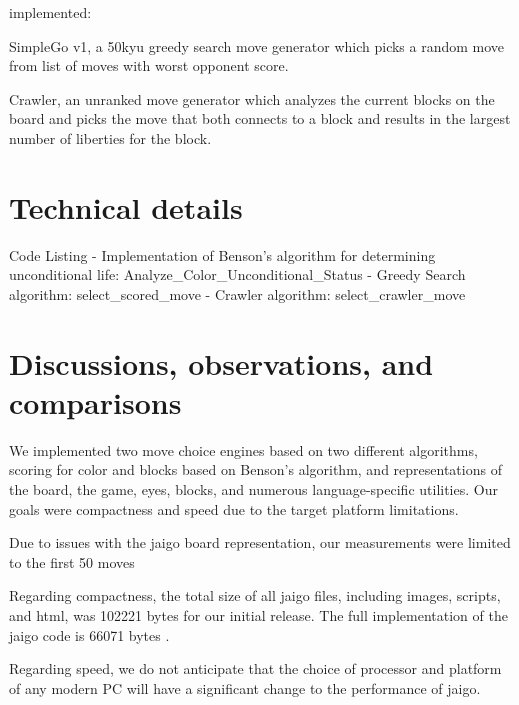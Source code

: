\documentclass{memoir}
\begin{document}
implemented:

SimpleGo v1, a 50kyu greedy search move generator which picks a random move from list of moves with worst opponent score.

Crawler, an unranked move generator which analyzes the current blocks on the board and picks the move that both connects to a block and results in the largest number of liberties for the block.

\chapter{Technical details}
Code Listing
- Implementation of Benson's algorithm for determining unconditional life: Analyze\_Color\_Unconditional\_Status
- Greedy Search algorithm: select\_scored\_move
- Crawler algorithm: select\_crawler\_move

\chapter{Discussions, observations, and comparisons}
We implemented two move choice engines based on two different algorithms, scoring for color and blocks based on Benson's algorithm, and representations of the board, the game, eyes, blocks, and numerous language-specific utilities. Our goals were compactness and speed due to the target platform limitations. 

Due to issues with the jaigo board representation, our measurements were limited to the first 50 moves

Regarding compactness, the total size of all jaigo files, including images, scripts, and html, was 102221 bytes for our initial release. The full implementation of the jaigo code is 66071 bytes \cite{SpeedReport}.

Regarding speed, we do not anticipate that the choice of processor and platform of any modern PC will have a significant change to the performance of jaigo.
\end{document}
